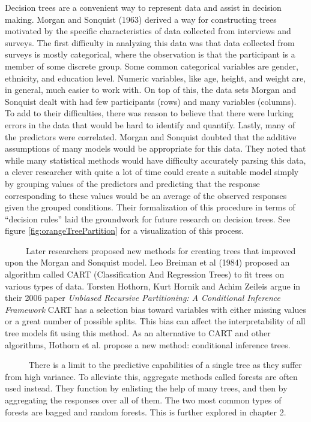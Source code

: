 \documentclass[12pt,twoside]{reedthesis}
\begin{document}
  Decision trees are a convenient way to represent data and assist in
  decision making. Morgan and Sonquist (1963) derived a way for
  constructing trees motivated by the specific characteristics of data
  collected from interviews and surveys. The first difficulty in analyzing
  this data was that data collected from surveys is mostly categorical,
  where the observation is that the participant is a member of some
  discrete group. Some common categorical variables are gender, ethnicity,
  and education level. Numeric variables, like age, height, and weight
  are, in general, much easier to work with. On top of this, the data sets
  Morgan and Sonquist dealt with had few participants (rows) and many
  variables (columns). To add to their difficulties, there was reason to
  believe that there were lurking errors in the data that would be hard to
  identify and quantify. Lastly, many of the predictors were correlated.
  Morgan and Sonquist doubted that the additive assumptions of many models
  would be appropriate for this data. They noted that while many
  statistical methods would have difficulty accurately parsing this data,
  a clever researcher with quite a lot of time could create a suitable
  model simply by grouping values of the predictors and predicting that
  the response corresponding to these values would be an average of the
  observed responses given the grouped conditions. Their formalization of
  this procedure in terms of ``decision rules'' laid the groundwork for
  future research on decision trees. See figure
  \ref{fig:orangeTreePartition} for a visualization of this process.
  
  ~~~~~Later researchers proposed new methods for creating trees that
  improved upon the Morgan and Sonquist model. Leo Breiman et al (1984)
  proposed an algorithm called CART (Classification And Regression Trees)
  to fit trees on various types of data. Torsten Hothorn, Kurt Hornik and
  Achim Zeileis argue in their 2006 paper \emph{Unbiased Recursive
  Partitioning: A Conditional Inference Framework} CART has a selection
  bias toward variables with either missing values or a great number of
  possible splits. This bias can affect the interpretability of all tree
  models fit using this method. As an alternative to CART and other
  algorithms, Hothorn et al. propose a new method: conditional inference
  trees.
  
  ~~~~~ There is a limit to the predictive capabilities of a single tree
  as they suffer from high variance. To alleviate this, aggregate methods
  called forests are often used instead. They function by enlisting the
  help of many trees, and then by aggregating the responses over all of
  them. The two most common types of forests are bagged and random
  forests. This is further explored in chapter 2.
  
\end{document}
